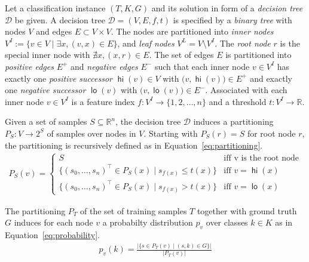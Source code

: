 \documentclass{easychair}
\DeclareMathOperator\hi{\ensuremath{\mathsf{hi}}}
\DeclareMathOperator\lo{\ensuremath{\mathsf{lo}}}
\theoremstyle{definition}
\begin{document}
\newcommand{\innernodes}{\ensuremath{V^{\!I}}}
\newcommand{\leafnodes}{\ensuremath{V^{\!L}}}
\newcommand{\edgesH}{\ensuremath{E^+}}
\newcommand{\edgesL}{\ensuremath{E^-}}

Let a classification instance $(T, K, G)$ and its solution in form of a \emph{decision tree} $\mathcal{D}$ be given. 
A decision tree $\mathcal{D} = (V, E, f, t)$ is specified by a \emph{binary tree} with nodes $V$ and edges $E \subset V \times V$. 
The nodes are partitioned into \emph{inner nodes} $\innernodes := \{ v \in V \mid \exists x, (v,x) \in E\}$, and \emph{leaf nodes} $\leafnodes = V \setminus \innernodes$. 
The \emph{root node} $r$ is the special inner node with $\nexists x, (x,r) \in E$. 
The set of edges $E$ is partitioned into \emph{positive edges} $\edgesH$ and \emph{negative edges} $\edgesL$ such that each inner node $v \in \innernodes$ has exactly one \emph{positive successor} $\hi(v) \in V$ with $\bigl(v, \hi(v)\bigr) \in \edgesH$ and exactly one \emph{negative successor} $\lo(v)$ with $\bigl(v, \lo(v)\bigr) \in \edgesL$. 
Associated with each inner node $v \in \innernodes$ is a feature index $f : \innernodes \rightarrow \{1, 2, \dots, n\}$ and a threshold $t : \innernodes \rightarrow \mathbb{R}$. 

Given a set of samples $S \subseteq \mathbb{R}^n$, the decision tree $\mathcal{D}$ induces a partitioning $P_S : V \rightarrow 2^S$ of samples over nodes in $V$. 
Starting with $P_S(r) = S$ for root node $r$, the partitioning is recursively defined as in Equation~\ref{eq:partitioning}. 
\begin{align}
\label{eq:partitioning}
P_S(v) = \begin{cases}
S & \text{iff v is the root node}\\
\bigl\{(s_0, \dots, s_n)^{\intercal} \in P_S(x) \mid s_{\!f\!(\!x\!)} \leq t(x)\bigr\} & \text{iff }v=\hi(x)\\
\bigl\{(s_0, \dots, s_n)^{\intercal} \in P_S(x) \mid s_{\!f\!(\!x\!)} > t(x)\bigr\} & \text{iff }v=\lo(x)
\end{cases}
\end{align}

The partitioning $P_T$ of the set of training samples $T$ together with ground truth $G$ induces for each node $v$ a probabilty distribution $p_v$ over classes $k \in K$ as in Equation~\ref{eq:probability}. 
\begin{align}
\label{eq:probability}
p_v(k) = \frac{\bigl| \{ s \in P_T(v) \mid (s, k) \in G \} \bigr|}{\bigl|P_T(v)\bigr|}
\end{align}
\end{document}
